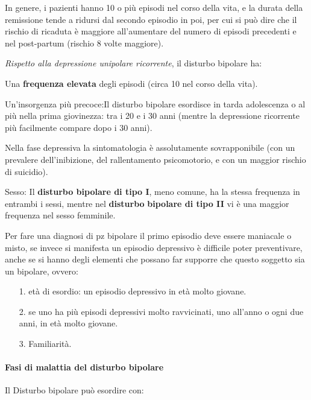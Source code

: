 In genere, i pazienti hanno 10 o più episodi nel corso della vita, e la
durata della remissione tende a ridursi dal secondo episodio in poi, per
cui si può dire che il rischio di ricaduta è maggiore all'aumentare del
numero di episodi precedenti e nel post-partum (rischio 8 volte
maggiore).

\emph{Rispetto alla depressione unipolare ricorrente}, il disturbo
bipolare ha:

Una \textbf{frequenza elevata} degli episodi (circa 10 nel corso della
vita).

Un'insorgenza più precoce:Il disturbo bipolare esordisce in tarda
adolescenza o al più nella prima giovinezza: tra i 20 e i 30 anni
(mentre la depressione ricorrente più facilmente compare dopo i 30
anni).

Nella fase depressiva la sintomatologia è assolutamente sovrapponibile
(con un prevalere dell'inibizione, del rallentamento psicomotorio, e con
un maggior rischio di suicidio).

Sesso: Il \textbf{disturbo bipolare di tipo I}, meno comune, ha la
stessa frequenza in entrambi i sessi, mentre nel \textbf{disturbo}
\textbf{bipolare di tipo II} vi è una maggior frequenza nel sesso
femminile.

Per fare una diagnosi di pz bipolare il primo episodio deve essere
maniacale o misto, se invece si manifesta un episodio depressivo è
difficile poter preventivare, anche se si hanno degli elementi che
possano far supporre che questo soggetto sia un bipolare, ovvero:

\begin{itemize}
\item[1.]
  età di esordio: un episodio depressivo in età molto giovane.
\item[2.]
  se uno ha più episodi depressivi molto ravvicinati, uno all'anno o
  ogni due anni, in età molto giovane.
\item[3.]
  Familiarità.
\end{itemize}

\paragraph{Fasi di malattia del disturbo bipolare}

Il Disturbo bipolare può esordire con:

